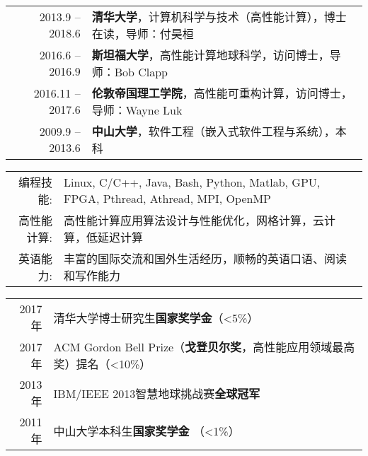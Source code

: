\documentclass[localFont]{awesome-source-cv} %
\begin{document}
\makecvheader

%
	\vspace{-18mm}
\begin{tabular}{rl}
	\textsc{2013.9 -- 2018.6}		&	\textbf{清华大学}，计算机科学与技术（高性能计算），博士在读，导师：付昊桓  \\
	\textsc{2016.6 -- 2016.9}		&	\textbf{斯坦福大学}，高性能计算地球科学，访问博士，导师：Bob Clapp \\
	\textsc{2016.11 -- 2017.6}		&	\textbf{伦敦帝国理工学院}，高性能可重构计算，访问博士，导师：Wayne Luk \\
	\textsc{2009.9 -- 2013.6}		&	\textbf{中山大学}，软件工程（嵌入式软件工程与系统），本科 \\
\end{tabular}

\begin{tabular}{>{}r>{}p{14cm}}
	\textsc{编程技能:}		&  Linux, C/C++, Java, Bash, Python, Matlab, GPU, FPGA, Pthread, Athread, MPI, OpenMP \\
	\textsc{高性能计算:} 		&  高性能计算应用算法设计与性能优化，网格计算，云计算，低延迟计算 \\
	\textsc{英语能力:}	    &  丰富的国际交流和国外生活经历，顺畅的英语口语、阅读和写作能力 \\
\end{tabular}

\begin{tabular}{rl}
	2017年 & 清华大学博士研究生\textbf{国家奖学金}（<5\%） \\
	2017年 & ACM Gordon Bell Prize（\textbf{戈登贝尔奖}，高性能应用领域最高奖）提名（<10\%）\\
	2013年 & IBM/IEEE 2013智慧地球挑战赛\textbf{全球冠军} \\
	2011年 & 中山大学本科生\textbf{国家奖学金} （<1\%）
\end{tabular}
\end{document}
